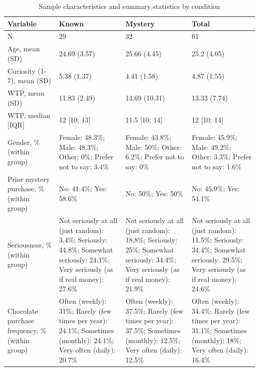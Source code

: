 \begin{table}

\caption{\label{tab:tab:summary}Sample characteristics and summary statistics by condition}
\centering
\begin{tabular}[t]{llll}
\toprule
Variable & Known & Mystery & Total\\
\midrule
N & 29 & 32 & 61\\
Age, mean (SD) & 24.69 (3.57) & 25.66 (4.45) & 25.2 (4.05)\\
Curiosity (1-7), mean (SD) & 5.38 (1.37) & 4.41 (1.58) & 4.87 (1.55)\\
WTP, mean (SD) & 11.83 (2.49) & 14.69 (10.31) & 13.33 (7.74)\\
WTP, median [IQR] & 12 [10; 13] & 11.5 [10; 14] & 12 [10; 14]\\
\addlinespace
Gender, \% (within group) & Female: 48.3\%; Male: 48.3\%; Other: 0\%; Prefer not to say: 3.4\% & Female: 43.8\%; Male: 50\%; Other: 6.2\%; Prefer not to say: 0\% & Female: 45.9\%; Male: 49.2\%; Other: 3.3\%; Prefer not to say: 1.6\%\\
Prior mystery purchase, \% (within group) & No: 41.4\%; Yes: 58.6\% & No: 50\%; Yes: 50\% & No: 45.9\%; Yes: 54.1\%\\
Seriousness, \% (within group) & Not seriously at all (just random): 3.4\%; Seriously: 44.8\%; Somewhat seriously: 24.1\%; Very seriously (as if real money): 27.6\% & Not seriously at all (just random): 18.8\%; Seriously: 25\%; Somewhat seriously: 34.4\%; Very seriously (as if real money): 21.9\% & Not seriously at all (just random): 11.5\%; Seriously: 34.4\%; Somewhat seriously: 29.5\%; Very seriously (as if real money): 24.6\%\\
Chocolate purchase frequency, \% (within group) & Often (weekly): 31\%; Rarely (few times per year): 24.1\%; Sometimes (monthly): 24.1\%; Very often (daily): 20.7\% & Often (weekly): 37.5\%; Rarely (few times per year): 37.5\%; Sometimes (monthly): 12.5\%; Very often (daily): 12.5\% & Often (weekly): 34.4\%; Rarely (few times per year): 31.1\%; Sometimes (monthly): 18\%; Very often (daily): 16.4\%\\
\bottomrule
\end{tabular}
\end{table}
